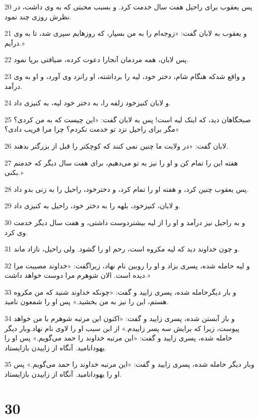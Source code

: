 \par 20 پس یعقوب برای راحیل هفت سال خدمت کرد. و بسبب محبتی که به وی داشت، در نظرش روزی چند نمود.
\par 21 و یعقوب به لابان گفت: «زوجه‌ام را به من بسپار، که روزهایم سپری شد، تا به وی درآیم.»
\par 22 پس لابان، همه مردمان آنجارا دعوت کرده، ضیافتی برپا نمود.
\par 23 و واقع شدکه هنگام شام، دختر خود، لیه را برداشته، او رانزد وی آورد، و او به وی درآمد.
\par 24 و لابان کنیزخود زلفه را، به دختر خود لیه، به کنیزی داد.
\par 25 صبحگاهان دید، که اینک لیه است! پس به لابان گفت: «این چیست که به من کردی؟ مگر برای راحیل نزد تو خدمت نکردم؟ چرا مرا فریب دادی؟»
\par 26 لابان گفت: «در ولایت ما چنین نمی کنند که کوچکتر را قبل از بزرگتر بدهند.
\par 27 هفته این را تمام کن و او را نیز به تو می‌دهیم، برای هفت سال دیگر که خدمتم بکنی.»
\par 28 پس یعقوب چنین کرد، و هفته او را تمام کرد، و دخترخود، راحیل را به زنی بدو داد.
\par 29 و لابان، کنیزخود، بلهه را به دختر خود، راحیل به کنیزی داد.
\par 30 و به راحیل نیز درآمد و او را از لیه بیشتردوست داشتی، و هفت سال دیگر خدمت وی کرد.
\par 31 و چون خداوند دید که لیه مکروه است، رحم او را گشود. ولی راحیل، نازاد ماند.
\par 32 و لیه حامله شده، پسری بزاد و او را روبین نام نهاد، زیراگفت: «خداوند مصیبت مرا دیده است. الان شوهرم مرا دوست خواهد داشت.»
\par 33 و بار دیگرحامله شده، پسری زایید و گفت: «چونکه خداوند شنید که من مکروه هستم، این را نیز به من بخشید.» پس او را شمعون نامید.
\par 34 و باز آبستن شده، پسری زایید و گفت: «اکنون این مرتبه شوهرم با من خواهد پیوست، زیرا که برایش سه پسر زاییدم.» از این سبب او را لاوی نام نهاد.وبار دیگر حامله شده، پسری زایید و گفت: «این مرتبه خداوند را حمد می‌گویم.» پس او را یهودانامید. آنگاه از زاییدن بازایستاد.
\par 35 وبار دیگر حامله شده، پسری زایید و گفت: «این مرتبه خداوند را حمد می‌گویم.» پس او را یهودانامید. آنگاه از زاییدن بازایستاد.
 
\chapter{30}


